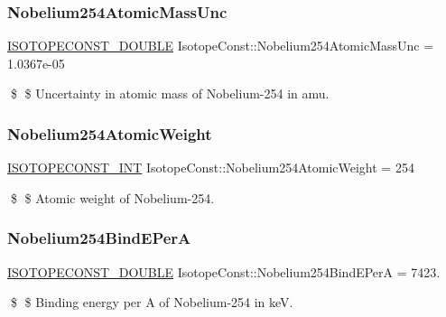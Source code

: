 \subsubsection{\texorpdfstring{Nobelium254\+Atomic\+Mass\+Unc}{Nobelium254AtomicMassUnc}}
{\footnotesize\ttfamily \mbox{\hyperlink{group___isotope_const-_macros_ga8f45a7272ce02c0b4c65c44636ed719a}{I\+S\+O\+T\+O\+P\+E\+C\+O\+N\+S\+T\+\_\+\+D\+O\+U\+B\+LE}} Isotope\+Const\+::\+Nobelium254\+Atomic\+Mass\+Unc = 1.\+0367e-\/05}

\$ \$ Uncertainty in atomic mass of Nobelium-\/254 in amu. \mbox{\label{group___isotope_const-_nobelium-_no254_gad0d2a0f65c2a3e2c0e19e3f6b872028a}} 
\subsubsection{\texorpdfstring{Nobelium254\+Atomic\+Weight}{Nobelium254AtomicWeight}}
{\footnotesize\ttfamily \mbox{\hyperlink{group___isotope_const-_macros_ga5f18360b3e99483a35c32d789e62621c}{I\+S\+O\+T\+O\+P\+E\+C\+O\+N\+S\+T\+\_\+\+I\+NT}} Isotope\+Const\+::\+Nobelium254\+Atomic\+Weight = 254}

\$ \$ Atomic weight of Nobelium-\/254. \mbox{\label{group___isotope_const-_nobelium-_no254_ga36b31c52b37df5afcd92d955e859e242}} 
\subsubsection{\texorpdfstring{Nobelium254\+Bind\+E\+PerA}{Nobelium254BindEPerA}}
{\footnotesize\ttfamily \mbox{\hyperlink{group___isotope_const-_macros_ga8f45a7272ce02c0b4c65c44636ed719a}{I\+S\+O\+T\+O\+P\+E\+C\+O\+N\+S\+T\+\_\+\+D\+O\+U\+B\+LE}} Isotope\+Const\+::\+Nobelium254\+Bind\+E\+PerA = 7423.}

\$ \$ Binding energy per A of Nobelium-\/254 in keV. \mbox{\label{group___isotope_const-_nobelium-_no254_ga5ba0c2fe0bd55eaa91ab8c95fdc79b14}} 
